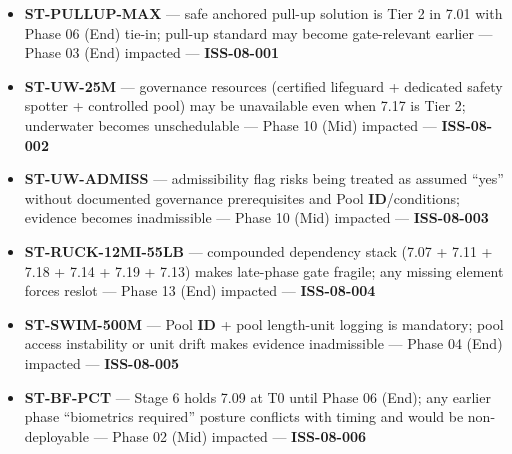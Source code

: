 \documentclass[10pt]{article}
\begin{document}
\begin{itemize}
\item \textbf{ST-PULLUP-MAX} — safe anchored pull-up solution is Tier 2 in 7.01 with Phase 06 (End) tie-in; pull-up standard may become gate-relevant earlier — Phase 03 (End) impacted — \textbf{ISS-08-001}
\item \textbf{ST-UW-25M} — governance resources (certified lifeguard + dedicated safety spotter + controlled pool) may be unavailable even when 7.17 is Tier 2; underwater becomes unschedulable — Phase 10 (Mid) impacted — \textbf{ISS-08-002}
\item \textbf{ST-UW-ADMISS} — admissibility flag risks being treated as assumed “yes” without documented governance prerequisites and Pool \textbf{ID}/conditions; evidence becomes inadmissible — Phase 10 (Mid) impacted — \textbf{ISS-08-003}
\item \textbf{ST-RUCK-12MI-55LB} — compounded dependency stack (7.07 + 7.11 + 7.18 + 7.14 + 7.19 + 7.13) makes late-phase gate fragile; any missing element forces reslot — Phase 13 (End) impacted — \textbf{ISS-08-004}
\item \textbf{ST-SWIM-500M} — Pool \textbf{ID} + pool length-unit logging is mandatory; pool access instability or unit drift makes evidence inadmissible — Phase 04 (End) impacted — \textbf{ISS-08-005}
\item \textbf{ST-BF-PCT} — Stage 6 holds 7.09 at T0 until Phase 06 (End); any earlier phase “biometrics required” posture conflicts with timing and would be non-deployable — Phase 02 (Mid) impacted — \textbf{ISS-08-006}
\end{itemize}
\end{document}
